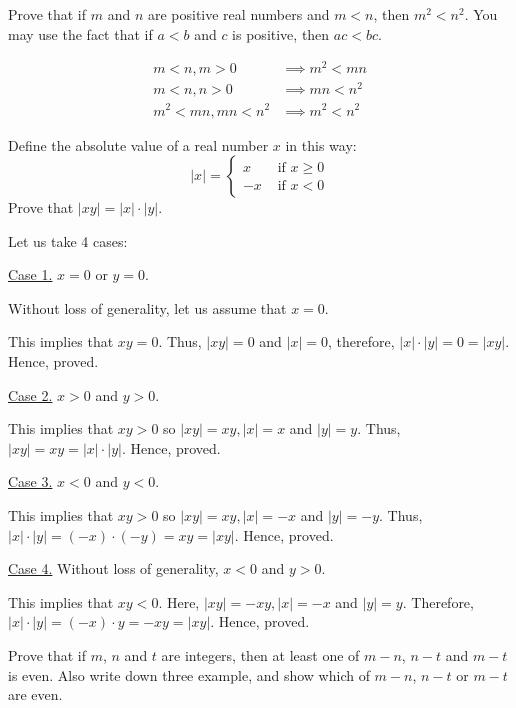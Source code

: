 \begin{problem}
	Prove that if $m$ and $n$ are positive real numbers and $m < n$, then $m^2 < n^2$. You may use the fact that if $a < b$ and $c$ is positive, then $ac < bc$.
\end{problem}

\begin{solution}
	\begin{align}
		m < n, m > 0 &\implies m^2 < mn \\
		m < n, n > 0 &\implies mn < n^2 \\
		m^2 < mn, mn < n^2 &\implies m^2 < n^2
	\end{align}
\end{solution}

\begin{problem}
	Define the absolute value of a real number $x$ in this way:
	$$ 
	|x| = 
	\begin{cases}
		x &\text{ if } x \geq 0 \\
		-x &\text{ if } x < 0
	\end{cases}
	$$
	Prove that $|xy| = |x| \cdot |y|$.
\end{problem}

\begin{solution}
	Let us take 4 cases:

	\underline{Case 1.} $x = 0$ or $y = 0$. 

	Without loss of generality, let us assume that $x = 0$.

	This implies that $xy = 0$. Thus, $|xy| = 0$ and $|x| = 0$, therefore, $|x|\cdot|y| = 0 = |xy|$. Hence, proved.

	\underline{Case 2.} $x > 0$ and $y > 0$.

	This implies that $xy > 0$ so $|xy| = xy, |x| = x$ and $|y| = y$.
	Thus, $|xy| = xy = |x|\cdot|y|$. Hence, proved.

	\underline{Case 3.} $x < 0$ and $y < 0$.

	This implies that $xy > 0$ so $|xy| = xy, |x| = -x$ and $|y| = -y$. 
	Thus, $|x|\cdot|y| = (-x) \cdot (-y) = xy = |xy|$. Hence, proved.

	\underline{Case 4.} Without loss of generality, $x < 0$ and $y > 0$.

	This implies that $xy < 0$. Here, $|xy| = -xy, |x| = -x$ and $|y| = y$.
	Therefore, $|x| \cdot |y| = (-x) \cdot y = -xy = |xy|$.
	Hence, proved.
\end{solution}

\begin{problem}
	Prove that if $m$, $n$ and $t$ are integers, then at least one of $m-n$, $n-t$ and $m-t$ is even. Also write down three example, and show which of $m-n$, $n-t$ or $m-t$ are even.
\end{problem}

